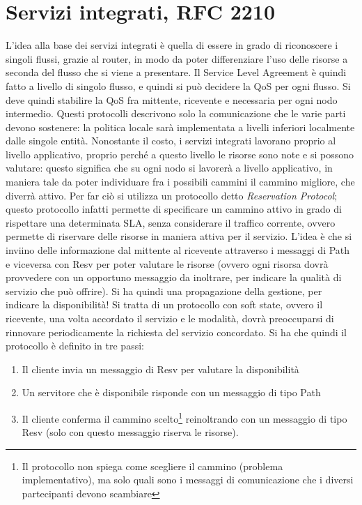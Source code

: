 \section{Servizi integrati, RFC 2210}
L'idea alla base dei servizi integrati è quella di essere in grado di
riconoscere i singoli flussi, grazie al router,
in modo da poter differenziare l'uso delle risorse a seconda del flusso che si
viene a presentare. Il Service Level
Agreement è quindi fatto a livello di singolo flusso, e quindi si può decidere
la QoS per ogni flusso. Si deve quindi
stabilire la QoS fra mittente, ricevente e necessaria per ogni nodo intermedio.
Questi protocolli descrivono solo la
comunicazione che le varie parti devono sostenere: la politica locale sarà
implementata a livelli inferiori localmente dalle singole entità.
Nonostante il costo, i servizi integrati lavorano proprio al livello
applicativo, proprio perché a questo
livello le risorse sono note e si possono valutare: questo significa che su ogni
nodo si lavorerà a livello applicativo,
in maniera tale da poter individuare fra i possibili cammini il cammino
migliore, che diverrà attivo. Per far ciò si
utilizza un protocollo detto \textit{Reservation Protocol}; questo protocollo
infatti permette di specificare un
cammino attivo in grado di rispettare una determinata SLA, senza considerare il
traffico corrente, ovvero permette di
riservare delle risorse in maniera attiva per il servizio. L'idea è che si
inviino delle informazione dal mittente al ricevente attraverso i messaggi di
Path e viceversa con Resv per poter valutare le risorse (ovvero ogni risorsa
dovrà provvedere con un opportuno messaggio da inoltrare, per indicare la
qualità di servizio che può offrire). Si ha quindi una propagazione della
gestione, per indicare la disponibilità!
Si tratta di un protocollo con soft state, ovvero il ricevente, una volta
accordato il servizio e le modalità, dovrà
preoccuparsi di rinnovare periodicamente la richiesta del servizio concordato.
Si ha che quindi il protocollo è
definito in tre passi:
\begin{enumerate}
 \item Il cliente invia un messaggio di Resv per valutare la disponibilità
 \item Un servitore che è disponibile risponde con un messaggio di tipo Path
 \item Il cliente conferma il cammino scelto\footnote{Il protocollo non spiega
come scegliere il cammino (problema
 implementativo), ma solo quali sono i messaggi di comunicazione che i diversi
partecipanti devono scambiare}
 reinoltrando con un messaggio di tipo Resv (solo con questo messaggio riserva
le risorse).
\end{enumerate}
